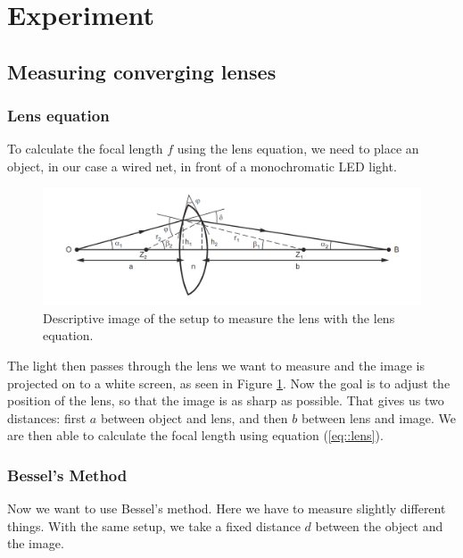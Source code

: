 \section{Experiment}

\subsection{Measuring converging lenses}
\subsubsection{Lens equation}
\label{chap::lens}

To calculate the focal length $f$ using the lens equation, we need to place an object, in our case a wired net, in front of a monochromatic LED light. 

\begin{figure}[ht]
	\centering
	\includegraphics[width=\textwidth]{img/lenseq.PNG}
	\caption{Descriptive image\cite{manual} of the setup to measure the lens with the lens equation.}
	\label{fig::lens}
\end{figure}

The light then passes through the lens we want to measure and the image is projected on to a white screen, as seen in Figure \ref{fig::lens}.
Now the goal is to adjust the position of the lens, so that the image is as sharp as possible.
That gives us two distances:
first $a$ between object and lens, and then $b$ between lens and image.
We are then able to calculate the focal length using equation (\ref{eq::lens}).


\subsubsection{Bessel's Method}
\label{chap::bessel}
Now we want to use Bessel's method.
Here we have to measure slightly different things.
With the same setup, we take a fixed distance $d$ between the object and the image. 

